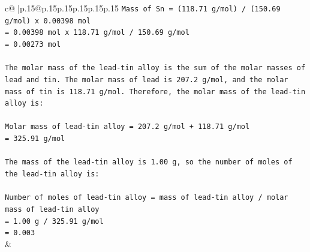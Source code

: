 \documentclass{article}
\begin{document}
{\begin{supertabular}{c@{$\;$}|p{.15\linewidth}@{}p{.15\linewidth}p{.15\linewidth}p{.15\linewidth}p{.15\linewidth}p{.15\linewidth}}
{{{\texttt{Mass of Sn = (118.71 g/mol) / (150.69 g/mol) x 0.00398 mol} \\
\texttt{= 0.00398 mol x 118.71 g/mol / 150.69 g/mol} \\
\texttt{= 0.00273 mol} \\
\\ 
\texttt{The molar mass of the lead{-}tin alloy is the sum of the molar masses of lead and tin. The molar mass of lead is 207.2 g/mol, and the molar mass of tin is 118.71 g/mol. Therefore, the molar mass of the lead{-}tin alloy is:} \\
\\ 
\texttt{Molar mass of lead{-}tin alloy = 207.2 g/mol + 118.71 g/mol} \\
\texttt{= 325.91 g/mol} \\
\\ 
\texttt{The mass of the lead{-}tin alloy is 1.00 g, so the number of moles of the lead{-}tin alloy is:} \\
\\ 
\texttt{Number of moles of lead{-}tin alloy = mass of lead{-}tin alloy / molar mass of lead{-}tin alloy} \\
\texttt{= 1.00 g / 325.91 g/mol} \\
\texttt{= 0.003} \\
            }
        }
    }
    & \\ \\

\end{supertabular}
}
\end{document}
